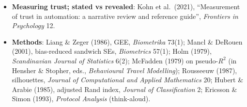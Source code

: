 \documentclass[10pt]{article}
\theoremstyle{definition}
\begin{document}
\begin{itemize}[itemsep=2pt]
    Section~\ref{sec:res:tier-trust}): Bahner, H\"uper \& Manzey (2008), ``Misuse of automated decision aids:
    complacency, automation bias and the impact of training experience'', \emph{IJHCS} 66(9); Goddard, Roudsari \&
    Wyatt (2012), ``Automation bias: a systematic review of frequency, effect mediators, and mitigators'',
    \emph{JAMIA} 19(1); Mosier \& Skitka (already in the bib).
  \item \textbf{Measuring trust; stated vs revealed}: Kohn et al.\ (2021), ``Measurement of trust in automation: a
    narrative review and reference guide'', \emph{Frontiers in Psychology} 12.
  \item \textbf{Methods}: Liang \& Zeger (1986), GEE, \emph{Biometrika} 73(1); Mancl \& DeRouen (2001), bias-reduced
    sandwich SEs, \emph{Biometrics} 57(1); Holm (1979), \emph{Scandinavian Journal of Statistics} 6(2); McFadden
    (1979) on pseudo-$R^2$ (in Hensher \& Stopher, eds., \emph{Behavioural Travel Modelling}); Rousseeuw (1987),
    silhouettes, \emph{Journal of Computational and Applied Mathematics} 20; Hubert \& Arabie (1985), adjusted Rand
    index, \emph{Journal of Classification} 2; Ericsson \& Simon (1993), \emph{Protocol Analysis} (think-aloud).
\end{itemize}
\end{document}
